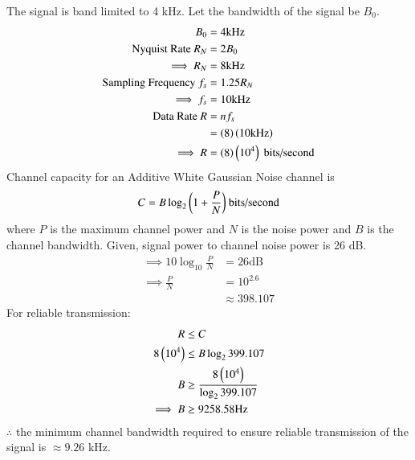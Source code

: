\documentclass[journal,12pt,twocolumn]{IEEEtran}
\theoremstyle{remark}
\begin{document}
The signal is band limited to 4 kHz.
Let the bandwidth of the signal be $B_0$.
\begin{align}
B_0 &= 4\text{kHz} \\
\text{Nyquist Rate } R_N &= 2B_0 \\
\implies R_N &= 8\text{kHz} \\
\text{Sampling Frequency } f_s &= 1.25R_N \\
\implies f_s &= 10\text{kHz} \\
\text{Data Rate } R &= nf_s \\
&= \left(8\right)\left(10\text{kHz}\right) \\
\implies R &= \left(8\right)\left(10^4\right)\text{ bits/second}
\end{align}
Channel capacity for an Additive White Gaussian Noise channel is
\begin{align}
C = B\log_2{\left(1 + \frac{P}{N}\right)}\text{ bits/second}
\end{align}
where $P$ is the maximum channel power and $N$ is the noise power and $B$ is the channel bandwidth.
Given, signal power to channel noise power is 26 dB.
\begin{align}
\implies 10\log_{10}{\frac{P}{N}} &= 26\text{dB} \\
\implies \frac{P}{N} &= 10^{2.6} \\
&\approx 398.107
\end{align}
For reliable transmission:
\begin{align}
R &\le C \\
8\left(10^4\right) &\le B\log_2{399.107} \\
B &\ge \frac{8\left(10^4\right)}{\log_2{399.107}} \\
\implies B &\ge 9258.58\text{Hz}
\end{align}
$\therefore$ the minimum channel bandwidth required to ensure reliable transmission of the signal is $\approx9.26$ kHz.
\end{document}
